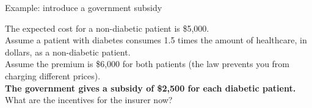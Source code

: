 \begin{frame}{Example: introduce a government subsidy}

    The expected cost for a non-diabetic patient is \$5,000.\\
    Assume a patient with diabetes consumes 1.5 times the amount of healthcare, in dollars, as a non-diabetic patient.\\
    Assume the premium is \$6,000 for both patients (the law prevents you from charging different prices).\\
    \textbf{The government gives a subsidy of \$2,500 for each diabetic patient.}\\
    What are the incentives for the insurer now?

\end{frame}
